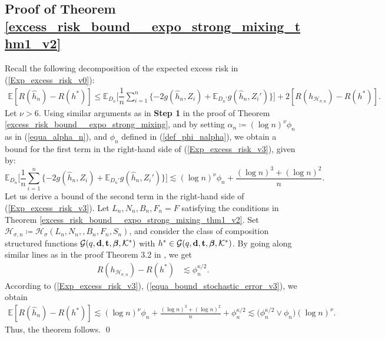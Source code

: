 \documentclass[10pt,twoside]{article}
\numberwithin{equation}{section}
\newcommand{\E}{\ensuremath{\mathbb{E}}}
\newcommand{\mk}{ { \mathcal{K}} }
\begin{document}
\subsection{Proof of Theorem \ref{excess_risk_bound__expo_strong_mixing_thm1_v2}}
Recall the following decomposition of the expected excess risk in (\ref{Exp_excess_risk_v0}):
%
%
\begin{align}\label{Exp_excess_risk_v3}
\E[R(\widehat{h}_n) - R(h^{*})] \leq  \E_{D_n} \Big[\dfrac{1}{n}\sum_{i= 1}^n \{ -2g(\widehat{h}_n, Z_i)+ \E_{D_n'} g(\widehat{h}_n, Z_i') \} \Big] + 2 [R(h_{\mathcal{H}_{\sigma, n}}) - R(h^{*})]. 
\end{align}
Let $\nu >6$.
Using similar arguments as in \textbf{Step 1} in the proof of Theorem \ref{excess_risk_bound__expo_strong_mixing}, and by setting $ \alpha_n \coloneqq (\log n)^{\nu}\phi_n$ as in (\ref{equa_alpha_n}), and $\phi_n$ defined in (\ref{def_phi_nalpha}), we obtain a bound for the first term in the right-hand side of (\ref{Exp_excess_risk_v3}), given by: 
%
\begin{equation} \label{equa_bound_stochastic_error_v3}
 \E_{D_n}  \Big[\dfrac{1}{n}\sum_{i= 1}^n \{ -2g(\widehat{h}_n, Z_i)+ \E_{D_n'} g(\widehat{h}_n, Z_i') \} \Big]  \lesssim (\log n)^{\nu}\phi_n + \frac{(\log n)^3 + (\log n)^2}{n}.    
\end{equation} 
%
Let us derive a bound of the second term in the right-hand side of (\ref{Exp_excess_risk_v3}).
%
%
Let $L_n, N_n, B_n, F_n = F$ satisfying the conditions in Theorem \ref{excess_risk_bound__expo_strong_mixing_thm1_v2}.
%
Set $\mathcal{H}_{\sigma, n} \coloneqq \mathcal{H}_{\sigma}(L_n, N_n,, B_n, F_n, S_n)$, and consider the class of composition structured functions $\mathcal{G}(q, \bold{d}, \bold{t}, \boldsymbol{\beta}, \mk^{*})$ with $h ^*
\in \mathcal{G}(q, \bold{d}, \bold{t}, \boldsymbol{\beta}, \mk^{*})$.
% 
By going along similar lines as in the proof Theorem 3.2 in \cite{kengne2025general}, we get
%
\begin{align}\label{excess_risk_bound_compo_holder_funct}
\nonumber R(h_{\mathcal{H}_{\sigma, n}}) - R(h^{*}) 
 & \lesssim \phi_n^{\kappa /2}.
\end{align}
%
%
According to (\ref{Exp_excess_risk_v3}), (\ref{equa_bound_stochastic_error_v3}), we obtain
%
\begin{align*}
\E[R(\widehat{h}_n) - R(h^{*})] \lesssim  (\log n)^{\nu}\phi_n + \frac{(\log n)^3 + (\log n)^2}{n} + \phi_n ^{\kappa /2}  \lesssim \Big(\phi_{n}^{\kappa/2} \lor \phi_n \Big) (\log n)^{\nu}. 
\end{align*}
Thus, the theorem follows.
\qed
\end{document}
